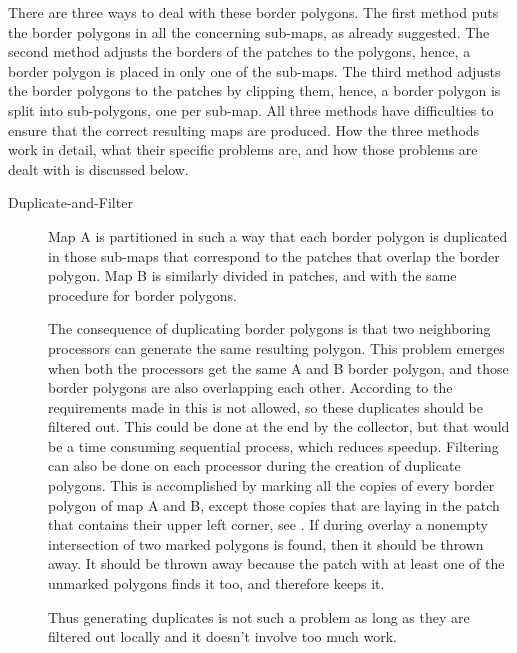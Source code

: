 There are three ways to deal with these border polygons.
The first method puts the border polygons in all the
concerning sub-maps, as 
 already suggested.
The second method adjusts the borders of the patches to the polygons,
hence, a border polygon is placed in only one of the sub-maps.
The third method adjusts the border polygons to the patches by
clipping them, hence, a border polygon is split into sub-polygons,
one per sub-map.
All three methods have difficulties to ensure that the correct resulting
maps are produced.
How the three methods work in detail, what their specific problems
are, and how those problems are dealt with is discussed below.

\begin{description}
  \item[Duplicate-and-Filter]
    Map A is partitioned in such a way that each border polygon is 
    duplicated in those sub-maps that correspond to the 
    patches that overlap the border polygon.
    Map B is similarly divided in patches, and with
    the same procedure for border polygons.

    The consequence of duplicating border polygons is that
    two neighboring processors can generate the same resulting
    polygon.
    This problem emerges when both the processors get the same A
    and B border polygon, and those border polygons are also
    overlapping each other.
    According to the requirements made in
     this is not allowed,
    so these duplicates should be filtered out.
    This could be done at the end by the collector, but that would be
    a time consuming sequential process, which reduces speedup.
    Filtering can also be done on each processor during
    the creation of duplicate polygons.
    This is accomplished by marking all the copies of every border
    polygon of map A and B, except those copies that are laying in the
    patch that contains their upper left corner, see
    .
    If during overlay a nonempty intersection of two marked polygons
    is found, then it should be thrown away.
    It should be thrown away because the patch with at least one
    of the unmarked polygons finds it too, and therefore keeps it.

    Thus generating duplicates is not such a problem as long as they
    are filtered out locally and it doesn't involve too much work.

    \begin{figure}[hbtp]
      \begin{centering}
        \hspace{0cm}
      \end{centering}
    \end{figure}



\end{description}
